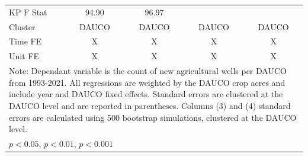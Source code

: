 \begin{table}[htbp]
\begin{tabular}{l*{4}{c}}
KP F Stat           &       94.90         &       96.97         &                     &                     \\
Cluster             &       DAUCO         &       DAUCO         &       DAUCO         &       DAUCO         \\
Time FE             &           X         &           X         &           X         &           X         \\
Unit FE             &           X         &           X         &           X         &           X         \\
\hline\hline
\multicolumn{5}{l}{\footnotesize Note: Dependant variable is the count of new agricultural wells per DAUCO from 1993-2021. All regressions are weighted by the DAUCO crop acres and include year and DAUCO fixed effects. Standard errors are clustered at the DAUCO level and are reported in parentheses. Columns (3) and (4) standard errors are calculated using 500 bootstrap simulations, clustered at the DAUCO level.}\\
\multicolumn{5}{l}{\footnotesize \sym{*} \(p<0.05\), \sym{**} \(p<0.01\), \sym{***} \(p<0.001\)}\\
\end{tabular}
\end{table}
